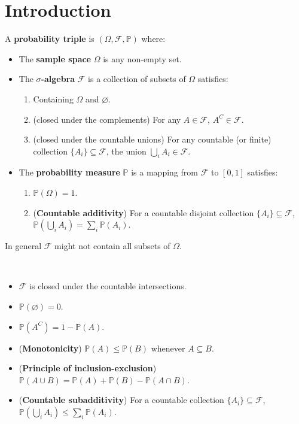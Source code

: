 \chapter{Introduction}

\begin{definition}
    \normalfont A \textbf{probability triple} is $(\Omega, \mathcal{F}, \mathbb{P})$ where:
    \begin{itemize}
        \item The \textbf{sample space} $\Omega$ is any non-empty set.
        \item The \textbf{$\sigma$-algebra} $\mathcal{F}$ is a collection of subsets of $\Omega$ satisfies:
        \begin{enumerate}
            \item Containing $\Omega$ and $\varnothing$.
            \item (closed under the complements) For any $A \in \mathcal{F}$, $A^{C} \in \mathcal{F}$.
            \item (closed under the countable unions) For any countable (or finite) collection $\{ A_i \} \subseteq \mathcal{F}$, the union $\bigcup_{i} A_i \in \mathcal{F}$.
        \end{enumerate}
        \item The \textbf{probability measure} $\mathbb{P}$ is a mapping from $\mathcal{F}$ to $[0,1]$ satisfies:
        \begin{enumerate}
            \item $\mathbb{P}(\Omega) = 1$.
            \item (\textbf{Countable additivity}) For a countable disjoint collection $\{ A_i \} \subseteq \mathcal{F}$, $\mathbb{P}(\bigcup_{i} A_i) = \sum\limits_{i} \mathbb{P}(A_i)$.
        \end{enumerate}
    \end{itemize}
\end{definition}

    
\begin{remark}
    In general $\mathcal{F}$ might not contain all subsets of $\Omega$.
\end{remark}

\begin{corollary} ~
\begin{itemize}
    \item $\mathcal{F}$ is closed under the countable intersections.
    \item $\mathbb{P}(\varnothing) = 0$.
    \item $\mathbb{P}(A^{C}) = 1- \mathbb{P}(A)$.
    \item (\textbf{Monotonicity}) $\mathbb{P}(A) \le \mathbb{P}(B)$ whenever $A \subseteq B$.
    \item (\textbf{Principle of inclusion-exclusion}) $\mathbb{P}(A \cup B) = \mathbb{P}(A) + \mathbb{P}(B) - \mathbb{P}(A \cap B)$.
    \item (\textbf{Countable subadditivity}) For a countable collection $\{ A_i \} \subseteq \mathcal{F}$, $\mathbb{P}(\bigcup_{i} A_i) \le \sum\limits_{i} \mathbb{P}(A_i)$.
\end{itemize}
\end{corollary}

